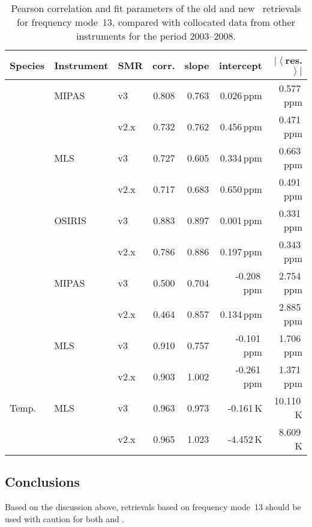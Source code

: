 \begin{table}[hbt]
\centering
\caption{Pearson correlation and fit parameters of the old and new \smr\
retrievals for frequency mode~13, compared with collocated data from other
instruments for the period 2003--2008.
}
\label{tab:fm13:stats}
\begin{tabular}{lllrrrr}
    \toprule
    \textbf{Species} & \textbf{Instrument} & \textbf{SMR} & \textbf{corr.} & \textbf{slope} & \textbf{intercept} & \textbf{$\left|\left<\right.\right.$res.$\left.\left.\right>\right|$} \\
    \midrule
    \chem{O3}   & MIPAS     & v3    & 0.808 & 0.763 & 0.026\,ppm    & 0.577\,ppm \\
                &           & v2.x  & 0.732 & 0.762 & 0.456\,ppm    & 0.471\,ppm \\
    \cline{2-7}
                & MLS       & v3    & 0.727 & 0.605 & 0.334\,ppm    & 0.663\,ppm \\
                &           & v2.x  & 0.717 & 0.683 & 0.650\,ppm    & 0.491\,ppm \\
    \cline{2-7}
                & OSIRIS    & v3    & 0.883 & 0.897 & 0.001\,ppm    & 0.331\,ppm \\
                &           & v2.x  & 0.786 & 0.886 & 0.197\,ppm    & 0.343\,ppm \\
    \midrule
    \chem{H_2O} & MIPAS     & v3    & 0.500 & 0.704 & -0.208\,ppm   & 2.754\,ppm \\
                &           & v2.x  & 0.464 & 0.857 & 0.134\,ppm    & 2.885\,ppm \\
    \cline{2-7}
                & MLS       & v3    & 0.910 & 0.757 & -0.101\,ppm   & 1.706\,ppm \\
                &           & v2.x  & 0.903 & 1.002 & -0.261\,ppm   & 1.371\,ppm \\
    \midrule
    Temp.       & MLS       & v3    & 0.963 & 0.973 & -0.161\,K     & 10.110\,K \\
                &           & v2.x  & 0.965 & 1.023 & -4.452\,K     &  8.609\,K \\
    \bottomrule
\end{tabular}
\end{table}

\subsection{Conclusions}
\label{sec:fm13:conclusions}
Based on the discussion above, retrievals based on frequency mode~13 should be
used with caution for both \chem{O_3} and \chem{H_2O}.
